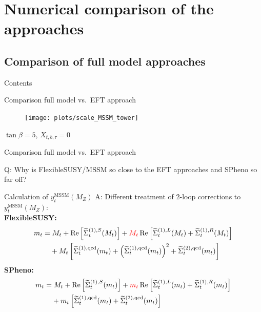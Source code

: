 \documentclass[hyperref={pdfpagelabels=false},ngerman]{beamer}
\DeclareMathOperator{\re}{Re}
\renewcommand{\emph}{\textbf}
\begin{document}

\section{Numerical comparison of the approaches}
\subsection{Comparison of full model approaches}

\begin{frame}{Contents}
  \tableofcontents[currentsection]  
\end{frame}

\begin{frame}{Comparison full model vs.\ EFT approach}
  \begin{figure}
    \centering
    \texttt{[image: plots/scale\_MSSM\_tower]}
  \end{figure}
  $\tan\beta = 5$, $X_{t,b,\tau} = 0$
\end{frame}

\begin{frame}{Comparison full model vs.\ EFT approach}
  \begin{center}
    Q: Why is FlexibleSUSY/MSSM so close to the EFT approaches and
    SPheno so far off?
  \end{center}
\end{frame}

\begin{frame}{Calculation of $y_t^{\text{MSSM}}(M_Z)$}
  A: Different treatment of 2-loop corrections to $y_t^{\text{MSSM}}(M_Z)$:
  \\[1em]
  \emph{FlexibleSUSY:}
  \begin{align*}
    m_t &=
    M_t+\re\left[
      \widetilde{\Sigma}_t^{(1),S}(M_t)\right] +
    \textcolor{red}{M_t} \re\left[
      \widetilde{\Sigma}_t^{(1),L}(M_t) +
      \widetilde{\Sigma}_t^{(1),R}(M_t)
    \right] \nonumber \\
    &\phantom{={}} + M_t
    \left[\widetilde{\Sigma}_t^{(1),\text{qcd}}(m_t)
      + \left(\widetilde{\Sigma}_t^{(1),\text{qcd}}(m_t)\right)^2
      + \widetilde{\Sigma}_t^{(2),\text{qcd}}(m_t)\right]
  \end{align*}
  \emph{SPheno:}
  \begin{align*}
    m_t &=
    M_t+\re\left[
      \widetilde{\Sigma}_t^{(1),S}(m_t)\right]+
    \textcolor{red}{m_t} \re\left[
      \widetilde{\Sigma}_t^{(1),L}(m_t) +
      \widetilde{\Sigma}_t^{(1),R}(m_t)
    \right] \nonumber \\
    &\phantom{={}} +
    m_t
    \left[\widetilde{\Sigma}_t^{(1),\text{qcd}}(m_t) +
      \widetilde{\Sigma}_t^{(2),\text{qcd}}(m_t)
    \right]
  \end{align*}
\end{frame}
\end{document}
